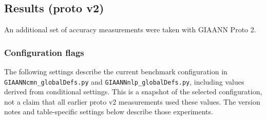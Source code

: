 \subsection{Results (proto v2)}

An additional set of accuracy measurements were taken with GIAANN Proto 2.

\subsubsection{Configuration flags}

The following settings describe the current benchmark configuration in \texttt{GIAANNcmn_globalDefs.py} and \texttt{GIAANNnlp_globalDefs.py}, including values derived from conditional settings. This is a snapshot of the selected configuration, not a claim that all earlier proto v2 measurements used these values. The version notes and table-specific settings below describe those experiments.


